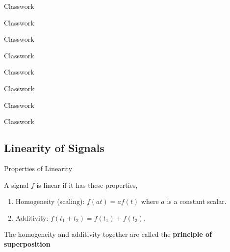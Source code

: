 \documentclass[aspectratio=169,xcolor=dvipsnames,svgnames,x11names,fleqn]{beamer}
\begin{document}
\begin{frame}{Classwork}
    
\end{frame}
\begin{frame}{Classwork}
    
\end{frame}
\begin{frame}{Classwork}
    
\end{frame}
\begin{frame}{Classwork}
    
\end{frame}
\begin{frame}{Classwork}
    
\end{frame}
\begin{frame}{Classwork}
    
\end{frame}
\begin{frame}{Classwork}
    
\end{frame}
\begin{frame}{Classwork}
    
\end{frame}


\subsection{Linearity of Signals}

\begin{frame}
    \subsectionpage
\end{frame}

\begin{frame}{Properties of Linearity}

    A signal $f$ is linear if it has these properties,

    \begin{enumerate}
        \item Homogeneity (scaling): $f(at) = af(t)$ where $a$ is a constant scalar.
        \item Additivity: $f(t_1+t_2) = f(t_1) + f(t_2)$.
    \end{enumerate}
    
    \bigskip

    \centering

    The homogeneity and additivity together are called the \textbf{principle of superposition}
\end{frame}
\end{document}
